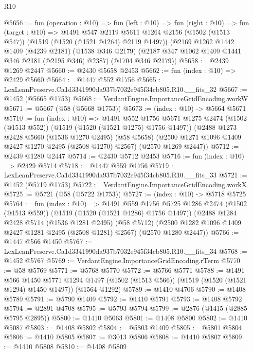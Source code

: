 \begin{lexlean}{R10}
\begin{coremodule}
@5656 := fun (operation : @10) =>
  fun (left : @10) =>
  fun (right : @10) =>
  fun (target : @10) =>
  @1491
    @547
    @2119
    @5611
    @1264
    @2156
    (@1502 (@1513 @547))
    (@1519 (@1520 (@1521 @1264) @2119 @1497))
    (@2169
      @1262
      @1442
      @1409
      (@4239 @2181)
      (@1538 @346 @2179)
      (@2187 @347 @1062 @1409 @1441 @346 @2181 (@2195 @346) @2387)
      (@1704 @346 @2179))
@5658 := @2439 @1269 @2447
@5660 := @2430 @5658 @2453
@5662 := fun (index : @10) => @2429 @5660
@5664 := @1447 @552 @1756
@5665 := LexLeanPreserve.Ca1d3341990da937b7032e945f34cb805.R10.__fits_32
@5667 := @1452 (@5665 @1753)
@5668 := VerdantEngine.ImportanceGridEncoding.workW
@5671 := @5667 (@58 (@5668 @1753))
@5673 := (index : @10) -> @5664 @5671
@5710 := fun (index : @10) =>
  @1491
    @552
    @1756
    @5671
    @1275
    @2474
    (@1502 (@1513 @552))
    (@1519 (@1520 (@1521 @1275) @1756 @1497))
    (@2488
      @1273
      @2428
      @5660
      (@1536 @1270 @2495)
      (@58 @5658)
      (@2500 @1271 @1096 @1409 @2427 @1270 @2495 (@2508 @1270) @2567)
      (@2570 @1269 @2447))
@5712 := @2439 @1280 @2447
@5714 := @2430 @5712 @2453
@5716 := fun (index : @10) => @2429 @5714
@5718 := @1447 @559 @1756
@5719 := LexLeanPreserve.Ca1d3341990da937b7032e945f34cb805.R10.__fits_33
@5721 := @1452 (@5719 @1753)
@5722 := VerdantEngine.ImportanceGridEncoding.workX
@5725 := @5721 (@58 (@5722 @1753))
@5727 := (index : @10) -> @5718 @5725
@5764 := fun (index : @10) =>
  @1491
    @559
    @1756
    @5725
    @1286
    @2474
    (@1502 (@1513 @559))
    (@1519 (@1520 (@1521 @1286) @1756 @1497))
    (@2488
      @1284
      @2428
      @5714
      (@1536 @1281 @2495)
      (@58 @5712)
      (@2500 @1282 @1096 @1409 @2427 @1281 @2495 (@2508 @1281) @2567)
      (@2570 @1280 @2447))
@5766 := @1447 @566 @1450
@5767 := LexLeanPreserve.Ca1d3341990da937b7032e945f34cb805.R10.__fits_34
@5768 := @1452 @5767
@5769 := VerdantEngine.ImportanceGridEncoding.rTerm
@5770 := @58 @5769
@5771 := @5768 @5770
@5772 := @5766 @5771
@5788 := @1491
    @566
    @1450
    @5771
    @1294
    @1497
    (@1502 (@1513 @566))
    (@1519 (@1520 (@1521 @1294) @1450 @1497))
    (@1564 @1292)
@5789 := @1410 @4706
@5790 := @1408 @5789
@5791 := @5790 @1409
@5792 := @1410 @5791
@5793 := @1408 @5792
@5794 := @2891 @4708
@5795 := @5793 @5794
@5799 := @2876 (@1415 (@2885 @5795 @2895))
@5800 := @1410 @5063
@5801 := @1408 @5800
@5802 := @1410 @5087
@5803 := @1408 @5802
@5804 := @5803 @1409
@5805 := @5801 @5804
@5806 := @1410 @5805
@5807 := @3013 @5806
@5808 := @1410 @5807
@5809 := @1410 @5808
@5810 := @1408 @5809

\end{coremodule}
\end{lexlean}
